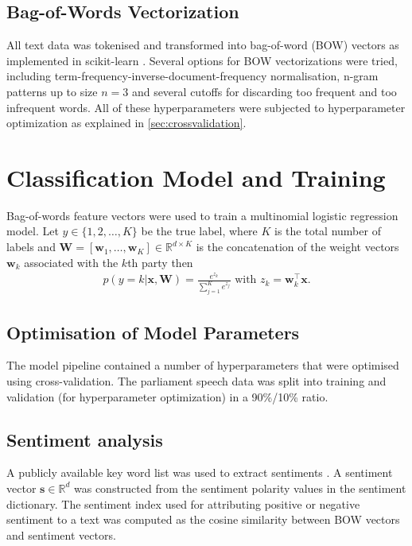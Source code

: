 \documentclass[11pt]{article}
\renewcommand{\vec}[1]{\mathbf{#1}}
\newcommand{\R}{\mathds{R}}
\begin{document}
\subsection{Bag-of-Words Vectorization}\label{sec:bow-vectorization}
All text data was tokenised and transformed into bag-of-word (BOW) vectors as implemented in scikit-learn \cite{scikit-learn}. Several options for BOW vectorizations were tried, including term-frequency-inverse-document-frequency normalisation, n-gram patterns up to size $n=3$ and several cutoffs for discarding too frequent and too infrequent words. All of these hyperparameters were subjected to hyperparameter optimization as explained in \autoref{sec:crossvalidation}.

\section{Classification Model and Training}\label{sec:model}
Bag-of-words feature vectors were used to train a multinomial logistic regression model. Let $y\in\{1,2,\dots,K\}$ be the true  label, where $K$ is the total number of labels and $\vec{W}=[\vec{w}_1,\dots,\vec{w}_K]\in\R^{d\times K}$ is the concatenation of the weight vectors $\vec{w}_k$ associated with the $k$th party then
\begin{eqnarray}\label{eq:logreg_multiclass}
p(y=k|\vec{x},\vec{W}) = \frac{e^{z_k}}{\sum_{j=1}^K e^{z_j}}  \textrm{ with }  z_k=\vec{w}_k^{\top}\vec{x}.
\end{eqnarray}

\subsection{Optimisation of Model Parameters}\label{sec:crossvalidation}
The model pipeline contained a number of  hyperparameters that were optimised using cross-validation. The parliament speech data was split into training and validation (for hyperparameter optimization) in a 90\%/10\% ratio. 
%
\subsection{Sentiment analysis}\label{sec:sentiment_analysis_methods}
A publicly available key word list was used to extract sentiments \cite{remquahey2010}. A sentiment vector $\vec{s}\in\R^d$ was constructed from the sentiment polarity values in the sentiment dictionary. The sentiment index used for attributing positive or negative sentiment to a text was computed as the cosine similarity between BOW vectors and sentiment vectors.
\end{document}
